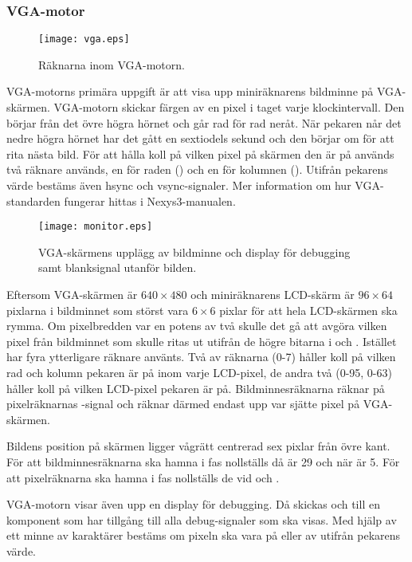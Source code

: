 \documentclass[main.tex]{subfiles}
\begin{document}
\subsubsection{VGA-motor}
\begin{SCfigure}
    \centering
    \texttt{[image: vga.eps]}
    \label{fig:vga}
    \caption{Räknarna inom VGA-motorn.}
\end{SCfigure}
VGA-motorns primära uppgift är att visa upp miniräknarens bildminne på
VGA-skärmen. VGA-motorn skickar färgen av en pixel i taget varje
klockintervall. Den börjar från det övre högra hörnet och går rad för rad
neråt. När pekaren når det nedre högra hörnet har det gått en sextiodels sekund
och den börjar om för att rita nästa bild. För att hålla koll på vilken pixel
på skärmen den är på används två räknare används, en för raden ()
och en för kolumnen (). Utifrån pekarens värde bestäms även hsync
och vsync-signaler. Mer information om hur VGA-standarden fungerar hittas i
Nexys3-manualen.\cite{nexys3}

\begin{wrapfigure}{r}{0.4\textwidth}
    \texttt{[image: monitor.eps]}
    \label{fig:monitor}
    \caption{VGA-skärmens upplägg av bildminne och display för debugging samt
    blanksignal utanför bilden.}
\end{wrapfigure}
Eftersom VGA-skärmen är $640\times480$ och miniräknarens LCD-skärm är
$96\times64$ pixlarna i bildminnet som störst vara $6\times6$ pixlar för att
hela LCD-skärmen ska rymma. Om pixelbredden var en potens av två skulle det gå
att avgöra vilken pixel från bildminnet som skulle ritas ut utifrån de högre
bitarna i  och . Istället har fyra ytterligare
räknare använts. Två av räknarna (0-7) håller koll på vilken rad och kolumn
pekaren är på inom varje LCD-pixel, de andra två (0-95, 0-63) håller koll på
vilken LCD-pixel pekaren är på. Bildminnesräknarna räknar på pixelräknarnas
-signal och räknar därmed endast upp var sjätte pixel på VGA-skärmen.

Bildens position på skärmen ligger vågrätt centrerad sex pixlar från övre kant.
För att bildminnesräknarna ska hamna i fas nollställs  då
 är 29 och  när  är 5. För att
pixelräknarna ska hamna i fas nollställs de vid  och
.

VGA-motorn visar även upp en display för debugging. Då skickas  
och  till en komponent som har tillgång till alla debug-signaler
som ska visas. Med hjälp av ett minne av karaktärer bestäms om pixeln ska vara
på eller av utifrån pekarens värde.
\end{document}
